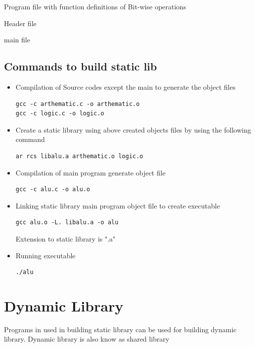 \documentclass[conference]{IEEEtran}
\begin{document}
\program
Program file with function definitions of Bit-wise operations


\program
Header file


\program 
main file


\subsection*{Commands to build static lib}
\begin{itemize}
\item Compilation of Source codes except the main to generate the object files
\begin{lstlisting}
gcc -c arthematic.c -o arthematic.o
gcc -c logic.c -o logic.o
\end{lstlisting}
\item Create a static library using above created objects files by using the following command
\begin{lstlisting}
ar rcs libalu.a arthematic.o logic.o
\end{lstlisting}
\item Compilation of main program generate object file
\begin{lstlisting}
gcc -c alu.c -o alu.o
\end{lstlisting}
\item Linking static library main program object file to create executable 
\begin{lstlisting}
gcc alu.o -L. libalu.a -o alu
\end{lstlisting}
Extension to static library is ".a"
\item Running executable
\begin{lstlisting}
./alu
\end{lstlisting}
\end{itemize}
\section{Dynamic Library}
Programs in used in building static library can be used for building dynamic library. Dynamic library is also know as shared library
\end{document}
